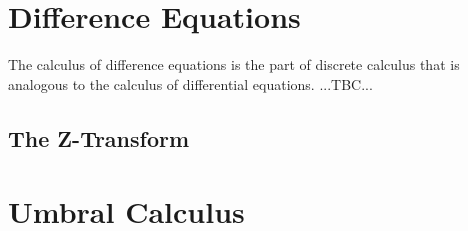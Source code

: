 





\section{Difference Equations}
The calculus of difference equations is the part of discrete calculus that is analogous to the calculus of differential equations. ...TBC...


\subsection{The Z-Transform}



\section{Umbral Calculus}

